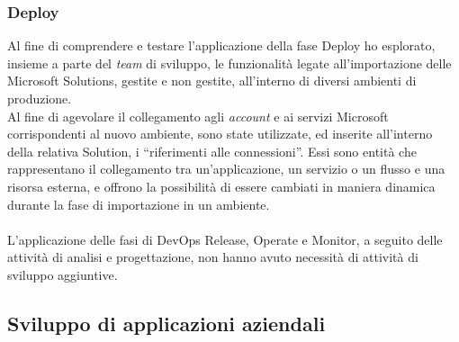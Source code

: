 \subsubsection*{Deploy}
Al fine di comprendere e testare l'applicazione della fase Deploy ho esplorato, insieme a parte del \emph{team} di sviluppo, le funzionalità legate all'importazione delle Microsoft Solutions, gestite e non gestite, all'interno di diversi ambienti di produzione.\\ 
Al fine di agevolare il collegamento agli \emph{account} e ai servizi Microsoft corrispondenti al nuovo ambiente, sono state utilizzate, ed inserite all'interno della relativa Solution, i “riferimenti alle connessioni”. Essi sono entità che rappresentano il collegamento tra un'applicazione, un servizio o un flusso e una risorsa esterna, e offrono la possibilità di essere cambiati in maniera dinamica durante la fase di importazione in un ambiente.\\\\
L'applicazione delle fasi di \gls{DevOps} Release, Operate e Monitor, a seguito delle attività di analisi e progettazione, non hanno avuto necessità di attività di sviluppo aggiuntive. 

\subsection{Sviluppo di applicazioni aziendali}
\label{sviluppoApplicazioni}
